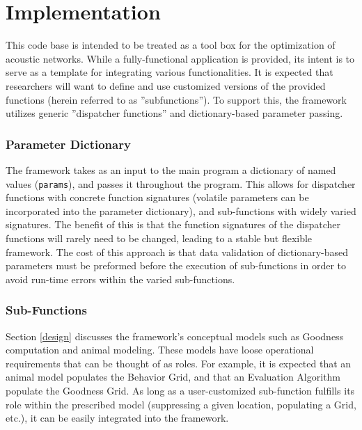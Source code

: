 \chapter{Implementation}
\label{implementation}
This code base is intended to be treated as a tool box for the optimization of acoustic networks.  While a fully-functional application is provided, its intent is to serve as a template for integrating various functionalities.  It is expected that researchers will want to define and use customized versions of the provided functions (herein referred to as ''subfunctions'').  To support this, the framework utilizes generic ''dispatcher functions'' and dictionary-based parameter passing.  

\subsection{Parameter Dictionary}
\label{parameterDictionary}
The framework takes as an input to the main program a dictionary of named values (\texttt{params}), and passes it throughout the program.  This allows for dispatcher functions with concrete function signatures (volatile parameters can be incorporated into the parameter dictionary), and sub-functions with widely varied signatures.  The benefit of this is that the function signatures of the dispatcher functions will rarely need to be changed, leading to a stable but flexible framework. The cost of this approach is that data validation of dictionary-based parameters must be preformed before the execution of sub-functions in order to avoid run-time errors within the varied sub-functions.  


\subsection{Sub-Functions}
\label{sub-functions}
Section \ref{design} discusses the framework's conceptual models such as Goodness computation and animal modeling.  These models have loose operational requirements that can be thought of as roles.  For example, it is expected that an animal model populates the Behavior Grid, and that an Evaluation Algorithm populate the Goodness Grid.  As long as a user-customized sub-function fulfills its role within the prescribed model (suppressing a given location, populating a Grid, etc.), it can be easily integrated into the framework.

